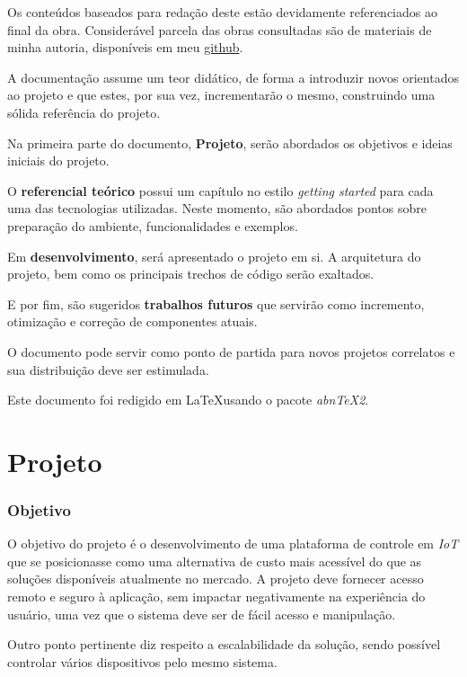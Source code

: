 \documentclass[
12pt,				%
openany,			%
twoside,			%
a4paper,			%
english,			%
french,				%
spanish,			%
brazil,				%
]{abntex2}
\begin{document}
Os conteúdos baseados para redação deste estão devidamente referenciados ao final da obra. Considerável parcela
das obras consultadas são de materiais de minha autoria, disponíveis em meu \href{https://github.com/GabrielMMelo/}{github}.

A documentação assume um teor didático, de forma a introduzir novos
orientados ao projeto e que estes, por sua vez, incrementarão o mesmo, 
construindo uma sólida referência do projeto.

Na primeira parte do documento, \textbf{Projeto}, serão abordados os objetivos e ideias iniciais do projeto.

O \textbf{referencial teórico} possui um capítulo no estilo \textit{getting started} para cada uma das tecnologias utilizadas. Neste momento, são abordados pontos sobre preparação do ambiente, funcionalidades e exemplos.

Em \textbf{desenvolvimento}, será apresentado o projeto em si. A arquitetura do projeto, bem como os principais trechos de código serão exaltados. 

E por fim, são sugeridos \textbf{trabalhos futuros} que servirão como incremento, otimização e correção de componentes atuais.

O documento pode servir como ponto de partida para novos projetos correlatos
e sua distribuição deve ser estimulada.

Este documento foi redigido em \LaTeX usando o pacote \textit{abnTeX2}.
\part{Projeto}

\section{Objetivo}
O objetivo do projeto é o desenvolvimento de uma plataforma de controle em \textit{IoT} que se posicionasse como uma alternativa de custo mais acessível do que as soluções disponíveis atualmente no mercado. A projeto deve fornecer acesso remoto e seguro à aplicação, sem impactar negativamente na experiência do usuário, uma vez que o sistema deve ser de fácil acesso e manipulação.

Outro ponto pertinente diz respeito a escalabilidade da solução, sendo possível controlar vários dispositivos pelo mesmo sistema.
\end{document}
